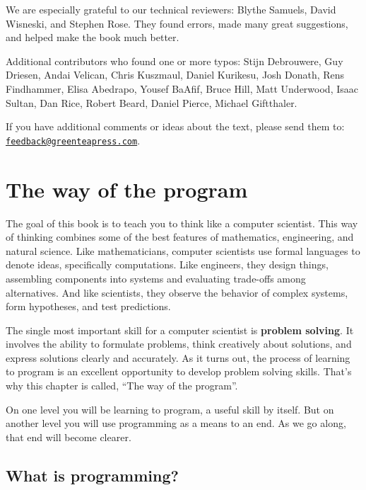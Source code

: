 \documentclass[12pt]{book}
\theoremstyle{exercise}
\begin{document}
We are especially grateful to our technical reviewers: Blythe Samuels, David Wisneski, and Stephen Rose.
They found errors, made many great suggestions, and helped make the book much better.

Additional contributors who found one or more typos: Stijn Debrouwere, Guy Driesen, Andai Velican, Chris Kuszmaul, Daniel Kurikesu, Josh Donath, Rens Findhammer, Elisa Abedrapo, Yousef BaAfif, Bruce Hill, Matt Underwood, Isaac Sultan, Dan Rice, Robert Beard, Daniel Pierce, Michael Giftthaler.

If you have additional comments or ideas about the text, please send them to: \href{mailto:feedback@greenteapress.com}{\tt feedback@greenteapress.com}.


\mainmatter


\chapter{The way of the program}
\label{theway}

The goal of this book is to teach you to think like a computer scientist.
This way of thinking combines some of the best features of mathematics, engineering, and natural science.
Like mathematicians, computer scientists use formal languages to denote ideas, specifically computations.
Like engineers, they design things, assembling components into systems and evaluating trade-offs among alternatives.
And like scientists, they observe the behavior of complex systems, form hypotheses, and test predictions.


The single most important skill for a computer scientist is {\bf problem solving}.
It involves the ability to formulate problems, think creatively about solutions, and express solutions clearly and accurately.
As it turns out, the process of learning to program is an excellent opportunity to develop problem solving skills.
That's why this chapter is called, ``The way of the program''.

On one level you will be learning to program, a useful skill by itself.
But on another level you will use programming as a means to an end.
As we go along, that end will become clearer.


\section{What is programming?}
\end{document}

